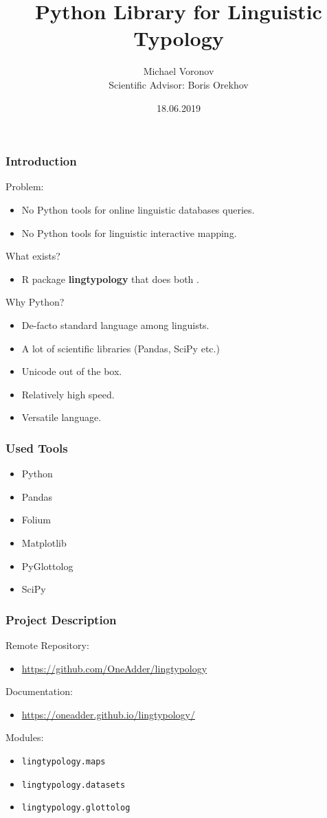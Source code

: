 \documentclass{beamer}
\title{Python Library for Linguistic Typology}
\author[Michael Voronov]{Michael Voronov\\{\small Scientific Advisor: Boris Orekhov}}
\institute{Higher School of Economics}
\date{18.06.2019}
\begin{document}
 
\frame{\titlepage}
 
\begin{frame}
\frametitle{Introduction}
Problem:
\begin{itemize}
 \item No Python tools for online linguistic databases queries.
 \item No Python tools for linguistic interactive mapping.
\end{itemize}
What exists?
\begin{itemize}
 \item R package \textbf{lingtypology} that does both \parencite{GeorgeMoroz2018}.
\end{itemize}
Why Python?
\begin{itemize}
 \item De-facto standard language among linguists.
 \item A lot of scientific libraries (Pandas, SciPy etc.)
 \item Unicode out of the box.
 \item Relatively high speed.
 \item Versatile language.
\end{itemize}
\end{frame}
 
\begin{frame}
\frametitle{Used Tools}
\begin{itemize}
 \item Python \parencite{python}
 \item Pandas \parencite{pandas}
 \item Folium \parencite{folium}
 \item Matplotlib \parencite{matplotlib}
 \item PyGlottolog \parencite{Robert2Forkel2019}
 \item SciPy \parencite{scipy}
\end{itemize}
\end{frame}


\begin{frame}
\frametitle{Project Description}
Remote Repository:
\begin{itemize}
 \item \url{https://github.com/OneAdder/lingtypology}
\end{itemize}
Documentation:
\begin{itemize}
 \item \url{https://oneadder.github.io/lingtypology/}
\end{itemize}
Modules:
\begin{itemize}
 \item \texttt{lingtypology.maps}
 \item \texttt{lingtypology.datasets}
 \item \texttt{lingtypology.glottolog}
\end{itemize}
\end{frame}
\end{document}
